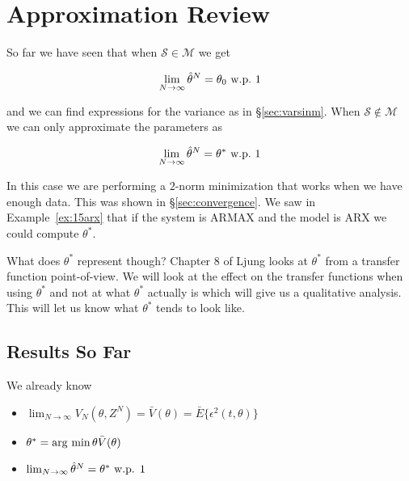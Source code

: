\mainmatter%
\setcounter{page}{1}

\lectureseries[\course]{\course}

\date{November 19, 2009}

\setaddress%

\setcounter{lecture}{15}
\setcounter{chapter}{15}


\section{Approximation Review}
So far we have seen that when $\mathcal{S}\in\mathcal{M}$ we get

\begin{equation*}
\lim_{N\to\infty}\hat{\theta}^N=\theta_0 \text{~w.p.~} 1
\end{equation*}

and we can find expressions for the variance as in \S\ref{sec:varsinm}.
When $\mathcal{S}\notin\mathcal{M}$ we can only approximate the parameters as

\begin{equation*}
\lim_{N\to\infty}\hat{\theta}^N=\theta^\ast \text{~w.p.~} 1
\end{equation*}

In this case we are performing a $2$-norm minimization that works when we have enough data.
This was shown in \S\ref{sec:convergence}.
We saw in Example~\ref{ex:15arx} that if the system is ARMAX and the model is ARX we could compute $\theta^\ast$.

What does $\theta^\ast$ represent though? Chapter 8 of Ljung looks at $\theta^\ast$ from a transfer function point-of-view.
We will look at the effect on the transfer functions when using $\theta^\ast$ and not at what $\theta^\ast$ actually is which will give us a qualitative analysis.
This will let us know what $\theta^\ast$ tends to look like.

\subsection{Results So Far}
We already know
\begin{itemize}
\item $\lim_{N\to\infty}V_N(\theta,Z^N) = \bar{V}(\theta) = \bar{E}\{\epsilon^2(t,\theta)\}$
\item $\theta^\ast = \mathop{\arg\,\min}\limits{\theta}\bar{V}(\theta)$
\item $\lim_{N\to\infty}\hat{\theta}^N = \theta^\ast \text{ w.p. } 1$
\end{itemize}

